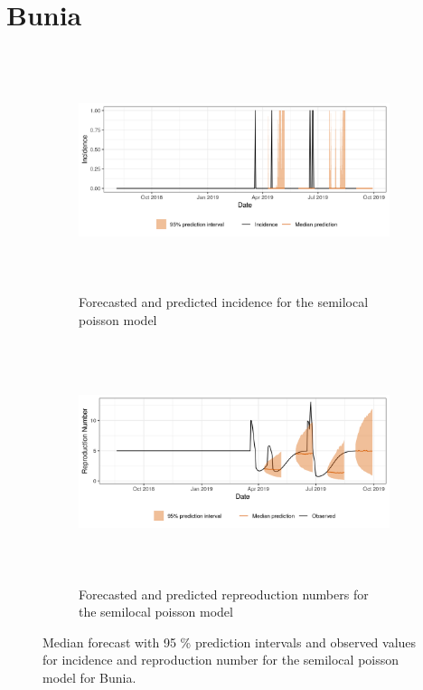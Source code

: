  \section{ Bunia }\begin{figure}[H]\begin{subfigure}{\textwidth}  \centering  \includegraphics[width=0.9\linewidth, height=7cm]{../output/Bunia_predictions.png}  \caption{Forecasted and predicted incidence for the semilocal poisson model}\end{subfigure}

\begin{subfigure}{\textwidth}  \centering  \includegraphics[width=0.9\linewidth, height=7cm]{../output/Bunia_Rs.png}  \caption{Forecasted and predicted repreoduction numbers for the semilocal poisson model}\end{subfigure}  \caption{Median forecast with 95 \% prediction intervals and observed values for incidence and reproduction number for the semilocal poisson model for Bunia.}\end{figure}

